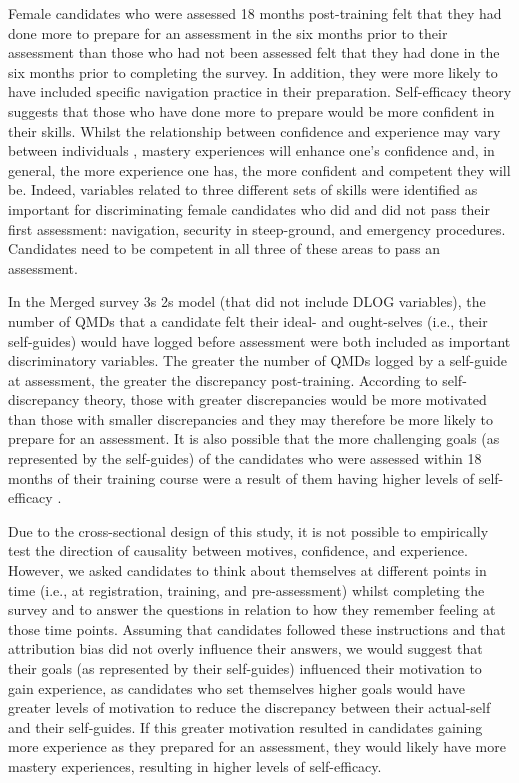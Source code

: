 \documentclass[
  12pt,
  a4paper,
]{book}
\begin{document}
Female candidates who were assessed 18 months post-training felt that they had done more to prepare for an assessment in the six months prior to their assessment than those who had not been assessed felt that they had done in the six months prior to completing the survey. In addition, they were more likely to have included specific navigation practice in their preparation. Self-efficacy theory suggests that those who have done more to prepare would be more confident in their skills. Whilst the relationship between confidence and experience may vary between individuals \citep{Weinberg2014}, mastery experiences will enhance one's confidence \citep{Bandura1977} and, in general, the more experience one has, the more confident and competent they will be. Indeed, variables related to three different sets of skills were identified as important for discriminating female candidates who did and did not pass their first assessment: navigation, security in steep-ground, and emergency procedures. Candidates need to be competent in all three of these areas to pass an assessment.

In the Merged survey 3s 2s model (that did not include DLOG variables), the number of QMDs that a candidate felt their ideal- and ought-selves (i.e., their self-guides) would have logged before assessment were both included as important discriminatory variables. The greater the number of QMDs logged by a self-guide at assessment, the greater the discrepancy post-training. According to self-discrepancy theory, those with greater discrepancies would be more motivated than those with smaller discrepancies \citep{Higgins1987} and they may therefore be more likely to prepare for an assessment. It is also possible that the more challenging goals (as represented by the self-guides) of the candidates who were assessed within 18 months of their training course were a result of them having higher levels of self-efficacy \citep[cf.~][]{Bandura1986}.

Due to the cross-sectional design of this study, it is not possible to empirically test the direction of causality between motives, confidence, and experience. However, we asked candidates to think about themselves at different points in time (i.e., at registration, training, and pre-assessment) whilst completing the survey and to answer the questions in relation to how they remember feeling at those time points. Assuming that candidates followed these instructions and that attribution bias did not overly influence their answers, we would suggest that their goals (as represented by their self-guides) influenced their motivation to gain experience, as candidates who set themselves higher goals would have greater levels of motivation to reduce the discrepancy between their actual-self and their self-guides. If this greater motivation resulted in candidates gaining more experience as they prepared for an assessment, they would likely have more mastery experiences, resulting in higher levels of self-efficacy.
\end{document}
